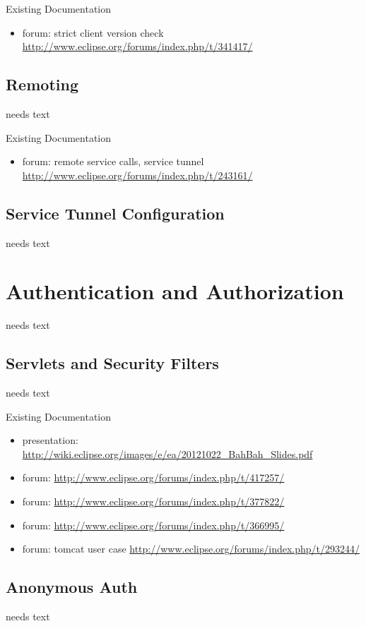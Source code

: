 \documentclass[a4paper,10pt,twoside]{book}
\begin{document}
\noindent Existing Documentation
\begin{itemize}
  \item forum: strict client version check \url{http://www.eclipse.org/forums/index.php/t/341417/}
\end{itemize}

\subsection{Remoting}
needs text

\noindent Existing Documentation
\begin{itemize}
  \item forum: remote service calls, service tunnel \url{http://www.eclipse.org/forums/index.php/t/243161/}
\end{itemize}

\subsection{Service Tunnel Configuration}
needs text
  
\section{Authentication and Authorization}
needs text

\subsection{Servlets and Security Filters}
needs text

\noindent Existing Documentation
\begin{itemize}
  \item presentation: \url{http://wiki.eclipse.org/images/e/ea/20121022_BahBah_Slides.pdf}
  \item forum: \url{http://www.eclipse.org/forums/index.php/t/417257/}
  \item forum: \url{http://www.eclipse.org/forums/index.php/t/377822/}
  \item forum: \url{http://www.eclipse.org/forums/index.php/t/366995/}
  \item forum: tomcat user case \url{http://www.eclipse.org/forums/index.php/t/293244/}
\end{itemize}

\subsection{Anonymous Auth}
needs text
\end{document}
